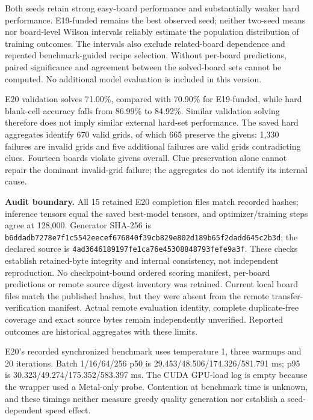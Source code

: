 \documentclass[
  british,
]{article}
\begin{document}
Both seeds retain strong easy-board performance and substantially weaker
hard performance. E19-funded remains the best observed seed; neither
two-seed means nor board-level Wilson intervals reliably estimate the
population distribution of training outcomes. The intervals also exclude
related-board dependence and repeated benchmark-guided recipe selection.
Without per-board predictions, paired significance and agreement between
the solved-board sets cannot be computed. No additional model evaluation
is included in this version.

E20 validation solves 71.00\%, compared with 70.90\% for E19-funded,
while hard blank-cell accuracy falls from 86.99\% to 84.92\%. Similar
validation solving therefore does not imply similar external hard-set
performance. The saved hard aggregates identify 670 valid grids, of
which 665 preserve the givens: 1,330 failures are invalid grids and five
additional failures are valid grids contradicting clues. Fourteen boards
violate givens overall. Clue preservation alone cannot repair the
dominant invalid-grid failure; the aggregates do not identify its
internal cause.

\textbf{Audit boundary.} All 15 retained E20 completion files match
recorded hashes; inference tensors equal the saved best-model tensors,
and optimizer/training steps agree at 128,000. Generator SHA-256 is
\texttt{b6ddadb7278e7f1c5542eecef676840f39cb829e802d189b65f2dadd645c2b3d};
the declared source is
\texttt{4ad3646189197fe1ca76e45308848793fefe9a3f}. These checks
establish retained-byte integrity and internal consistency, not
independent reproduction. No checkpoint-bound ordered scoring manifest,
per-board predictions or remote source digest inventory was retained.
Current local board files match the published hashes, but they were
absent from the remote transfer-verification manifest. Actual remote
evaluation identity, complete duplicate-free coverage and exact source
bytes remain independently unverified. Reported outcomes are historical
aggregates with these limits.

E20's recorded synchronized benchmark uses temperature 1, three warmups
and 20 iterations. Batch 1/16/64/256 p50 is
29.453/48.506/174.326/581.791 ms; p95 is 30.323/49.274/175.352/583.397
ms. The CUDA GPU-load log is empty because the wrapper used a Metal-only
probe. Contention at benchmark time is unknown, and these timings
neither measure greedy quality generation nor establish a seed-dependent
speed effect.
\end{document}
